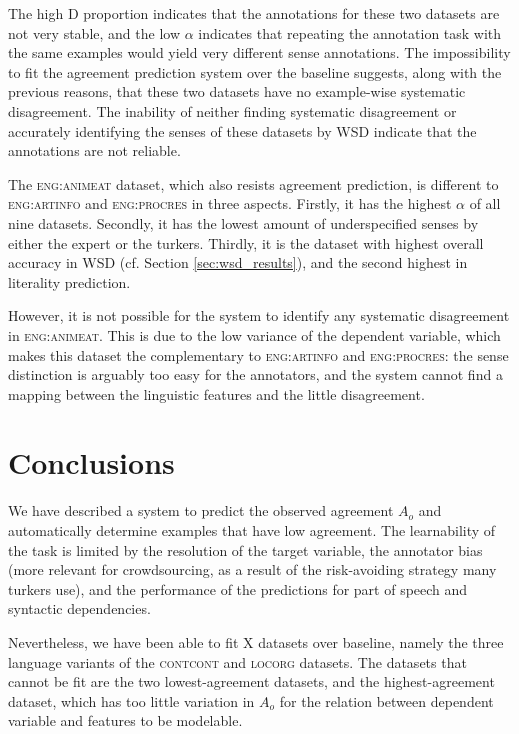 \documentclass[11pt,a4paper]{article}
\begin{document}
The high D proportion indicates that the annotations for these two datasets are not very stable, and the low $\alpha$ indicates that repeating the annotation task with the same examples would yield very different sense annotations. The impossibility to fit the agreement prediction system over the baseline suggests, along with the previous reasons, that these two datasets have no example-wise systematic disagreement. The inability of neither finding systematic disagreement or accurately identifying the senses of these datasets by WSD indicate that the annotations are not reliable. 

The \textsc{eng:animeat} dataset, which also resists agreement prediction, is different to \textsc{eng:artinfo} and \textsc{eng:procres} in three aspects. Firstly, it has the highest $\alpha$ of all nine datasets. Secondly, it has the lowest amount of underspecified senses by either the expert or the turkers. Thirdly, it is the dataset with highest overall accuracy in WSD (cf. Section \ref{sec:wsd_results}), and the second highest in literality prediction.

However, it is not possible for the system to identify any systematic disagreement in \textsc{eng:animeat}. This is due to the low variance of the dependent variable, which makes this dataset the complementary to \textsc{eng:artinfo} and \textsc{eng:procres}: the sense distinction is arguably too easy for the annotators, and the system cannot find a mapping between the linguistic features and the little disagreement. 

\section{Conclusions}

We have described a system to predict the observed agreement $A_o$  and automatically determine examples that have low agreement. The learnability of the task is limited by the resolution of the target variable, the annotator bias (more relevant for crowdsourcing, as a result of the risk-avoiding strategy many turkers use), and the performance of the predictions for part of speech and syntactic dependencies.

Nevertheless, we have been able to fit X datasets over baseline, namely the three language variants of the \textsc{contcont} and \textsc{locorg} datasets. The datasets that cannot be fit are the two lowest-agreement datasets, and the highest-agreement dataset, which has too little variation in $A_o$ for the relation between dependent variable and features to be modelable.
\end{document}

